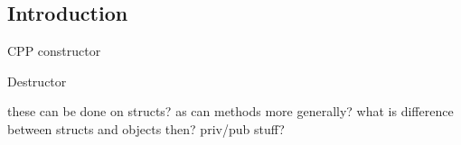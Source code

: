 
\subsection{Introduction}



CPP constructor

Destructor

these can be done on structs? as can methods more generally? what is difference between structs and objects then? priv/pub stuff?
